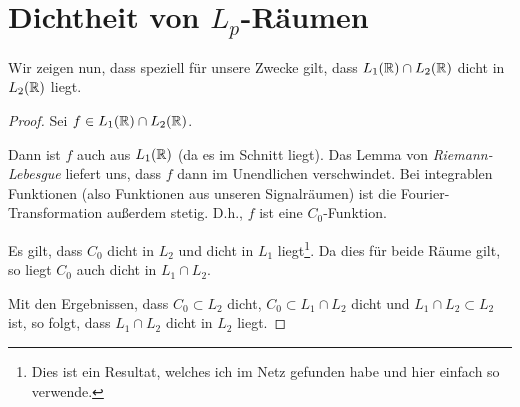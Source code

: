 
\section{Dichtheit von $L_p$-Räumen}\label{seq:densityoflebesguespaces}
Wir zeigen nun, dass speziell für unsere Zwecke gilt, dass
$ L_1(\mathbb{R}) \cap L_2(\mathbb{R}) $ dicht in $L_2(\mathbb{R})$ liegt.

\begin{proof}
Sei $f\in L_1(\mathbb{R}) \cap L_2(\mathbb{R})$.

Dann ist $f$ auch aus $L_1(\mathbb{R})$ (da es im Schnitt liegt). Das Lemma von
\emph{Riemann-Lebesgue} liefert uns, dass $f$ dann im Unendlichen verschwindet. Bei
integrablen Funktionen (also Funktionen aus unseren Signalräumen) ist die Fourier-Transformation
außerdem stetig. D.h., $f$ ist eine $C_0$-Funktion.

Es gilt, dass $C_0$ dicht in $L_2$ und dicht in $L_1$ liegt\footnote{Dies ist ein Resultat, welches
ich im Netz gefunden habe und hier einfach so verwende.}. Da dies für beide Räume gilt, so liegt
$C_0$ auch dicht in $L_1 \cap L_2$.

Mit den Ergebnissen, dass $C_0 \subset L_2$ dicht, $C_0 \subset L_1 \cap L_2$ dicht und 
$L_1 \cap L_2 \subset L_2$ ist, so folgt, dass $L_1 \cap L_2$ dicht in $L_2$ liegt.
\end{proof}




